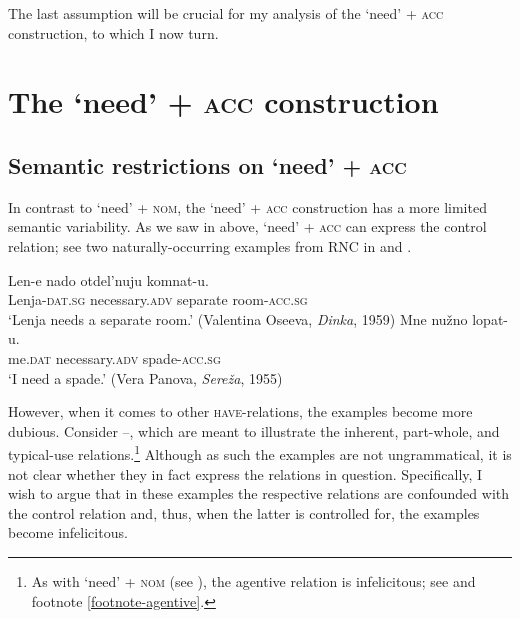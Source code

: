 \documentclass[output=paper,colorlinks,citecolor=brown]{langscibook}
\begin{document}
The last assumption will be crucial for my analysis of the `need' + \textsc{acc} construction, to which I now turn.

\section{The `need' + \textsc{acc} construction}\label{section-acc}

\subsection{Semantic restrictions on `need' + \textsc{acc}}\label{section-acc-restrictions}

In contrast to `need' + \textsc{nom}, the `need' + \textsc{acc} construction has a more limited semantic variability. As we saw in  above, `need' + \textsc{acc} can express the control relation; see two naturally-occurring examples from RNC in  and .

    \largerpage[-1] %

\ea
\ea\label{nuzhno-control-corpus-1}
\gll Len-e nado otdel'nuju komnat-u.\\
Lenja-\textsc{dat.sg} necessary.\textsc{adv} separate room-\textsc{acc.sg}\\
\glt `Lenja needs a separate room.’ \hfill (Valentina Oseeva, \textit{Dinka}, 1959)
\ex \label{nuzhno-control-corpus-2}
\gll Mne nužno lopat-u.\\
me.\textsc{dat} necessary.\textsc{adv} spade-\textsc{acc.sg}\\
\glt ‘I need a spade.’ \hfill (Vera Panova, \textit{Sereža}, 1955)
\z\z

\noindent However, when it comes to other \textsc{have}-relations, the examples become more dubious. Consider --, which are meant to illustrate the inherent, part-whole, and typical-use relations.\footnote{As with `need' + \textsc{nom} (see ), the agentive relation is infelicitous; see  and footnote \ref{footnote-agentive}.

\z
} Although as such the examples are not ungrammatical, it is not clear whether they in fact express the relations in question. Specifically, I wish to argue that in these examples the respective relations are confounded with the control relation and, thus, when the latter is controlled for, the examples become infelicitous.
\end{document}
